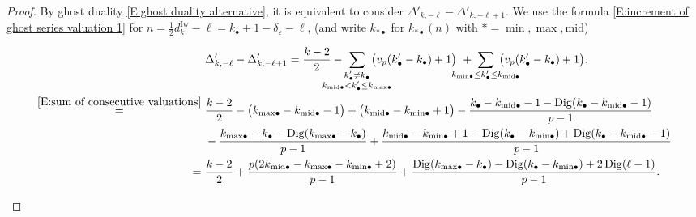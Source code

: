\documentclass[12pt]{amsart}
\theoremstyle{definition}
\numberwithin{equation}{subsection}
\DeclareMathOperator{\Dig}{Dig}
\newcommand{\Iw}{\mathrm{Iw}}
\newcommand{\midd}{\mathrm{mid}}
\begin{document}
\begin{proof}
By ghost duality \eqref{E:ghost duality alternative}, it is equivalent to consider $\Delta'_{k,-\ell} -\Delta'_{k, -\ell+1} $.
We use the formula \eqref{E:increment of ghost series valuation 1} for $n = \frac 12 d_{k}^\Iw - \ell = k_{\bullet}+1-\delta_\varepsilon -\ell$, (and write $k_{*\bullet}$ for $k_{* \bullet}(n)$ with $* = \min, \max, \midd$)
\begin{small}
\begin{align}
\nonumber
&\Delta'_{k,-\ell} - \Delta'_{k,-\ell+1}  = 
\frac{k-2}2-  \hspace{-20pt}
\sum_{\substack{k'_\bullet \neq k_\bullet \\
k_{\midd\bullet} < k'_\bullet  \leq k_{{\max}\bullet}}}
\hspace{-20pt}\big( v_p(k'_\bullet - k_{\bullet})+1 \big)\ +  \hspace{-20pt} \sum_{
k_{{\min}\bullet} \leq k'_\bullet \leq k _{{\midd}\bullet}}
\hspace{-20pt}\big( v_p(k'_\bullet - k_{\bullet})+1 \big).
\\
\nonumber
\stackrel{\eqref{E:sum of consecutive valuations}}=\ & \frac{k-2}2 - \big( k_{{\max}\bullet}-k_{\midd\bullet }-1\big) + \big( k_{\midd \bullet} -k_{{\min}\bullet} +1 \big)-\frac{k_\bullet-k_{{\midd}\bullet}-1- \Dig(k_\bullet-k_{{\midd}\bullet}-1)}{p-1}
\\
\nonumber
&- \frac{k_{{\max}\bullet}-k_\bullet - \Dig(k_{{\max}\bullet}-k_\bullet)}{p-1}+\frac{k_{{\midd}\bullet} - k_{{\min}\bullet} +1-\Dig(k_\bullet - k_{{\min}\bullet})+ \Dig(k_\bullet-k_{{\midd}\bullet}-1)}{p-1}
\\
\label{E:Delta'-Delta'}
=\ & \frac{k-2}2+ \frac {p(2k_{\midd \bullet}- k_{{\max}\bullet}- k_{{\min}\bullet}+2)}{p-1}+ \frac{\Dig(k_{{\max}\bullet} - k_{\bullet})- \Dig (k_{\bullet} - k_{{\min}\bullet})+2\Dig (\ell-1)}{p-1}.
\end{align}\end{small}

\end{proof}
\end{document}
